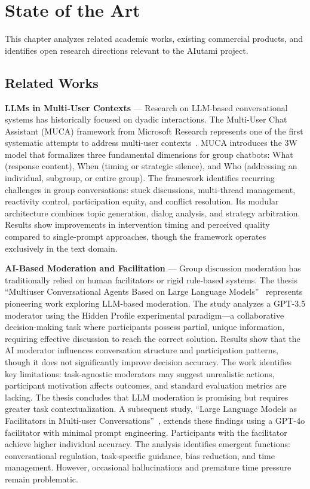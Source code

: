 \chapter{State of the Art}

This chapter analyzes related academic works, existing commercial products, and identifies open research directions relevant to the AIutami project.

\section{Related Works}

\textbf{LLMs in Multi-User Contexts} --- Research on LLM-based conversational systems has historically focused on dyadic interactions. The Multi-User Chat Assistant (MUCA) framework from Microsoft Research represents one of the first systematic attempts to address multi-user contexts~\cite{Mao2024MUCA}. MUCA introduces the 3W model that formalizes three fundamental dimensions for group chatbots: What (response content), When (timing or strategic silence), and Who (addressing an individual, subgroup, or entire group). The framework identifies recurring challenges in group conversations: stuck discussions, multi-thread management, reactivity control, participation equity, and conflict resolution. Its modular architecture combines topic generation, dialog analysis, and strategy arbitration. Results show improvements in intervention timing and perceived quality compared to single-prompt approaches, though the framework operates exclusively in the text domain.

\textbf{AI-Based Moderation and Facilitation} --- Group discussion moderation has traditionally relied on human facilitators or rigid rule-based systems. The thesis ``Multiuser Conversational Agents Based on Large Language Models''~\cite{Dubini2024MultiuserConversationalAgents} represents pioneering work exploring LLM-based moderation. The study analyzes a GPT-3.5 moderator using the Hidden Profile experimental paradigm---a collaborative decision-making task where participants possess partial, unique information, requiring effective discussion to reach the correct solution. Results show that the AI moderator influences conversation structure and participation patterns, though it does not significantly improve decision accuracy. The work identifies key limitations: task-agnostic moderators may suggest unrealistic actions, participant motivation affects outcomes, and standard evaluation metrics are lacking. The thesis concludes that LLM moderation is promising but requires greater task contextualization. A subsequent study, ``Large Language Models as Facilitators in Multi-user Conversations''~\cite{Anonymous2026LLMFacilitators}, extends these findings using a GPT-4o facilitator with minimal prompt engineering. Participants with the facilitator achieve higher individual accuracy. The analysis identifies emergent functions: conversational regulation, task-specific guidance, bias reduction, and time management. However, occasional hallucinations and premature time pressure remain problematic.

